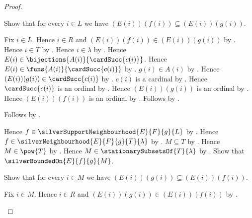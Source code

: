 \begin{proof}
\begin{byCase}
            \begin{subproof}
                Show that for every $i\in L$ we have
                    $(E(i))(f(i))\subseteq(E(i))(g(i))$.
                \begin{subproof}
                    Fix $i\in L$.
                    Hence $i\in R$ and
                        $(E(i))(f(i))\in(E(i))(g(i))$
                        by .
                    Hence $i\in T$ by .
                    Hence $i\in\lambda$ by .
                    Hence $E(i)\in\bijections{A(i)}{\cardSucc{c(i)}}$.
                    Hence $E(i)\in\funs{A(i)}{\cardSucc{c(i)}}$
                        by .
                    $g(i)\in A(i)$ by .
                    Hence $(E(i))(g(i))\in\cardSucc{c(i)}$
                        by .
                    $c(i)$ is a cardinal
                        by .
                    Hence $\cardSucc{c(i)}$ is an ordinal
                        by .
                    Hence $(E(i))(g(i))$ is an ordinal
                        by .
                    Hence $(E(i))(f(i))$ is an ordinal
                        by .
                    Follows by .
                \end{subproof}
                Follows by .
            \end{subproof}
            Hence $f\in\silverSupportNeighbourhood{E}{F}{g}{L}$
                by .
            Hence $f\in\silverNeighbourhood{E}{F}{g}{T}{\lambda}$
                by .
            $M\subseteq T$ by .
            Hence $M\in\pow{T}$ by .
            Hence $M\in\stationarySubsetsOf{T}{\lambda}$
                by .
            Show that $\silverBoundedOn{E}{f}{g}{M}$.
            \begin{subproof}
                Show that for every $i\in M$ we have
                    $(E(i))(g(i))\subseteq(E(i))(f(i))$.
                \begin{subproof}
                    Fix $i\in M$.
                    Hence $i\in R$ and
                        $(E(i))(g(i))\in(E(i))(f(i))$
                        by .

\end{subproof}
\end{subproof}
\end{byCase}
\end{proof}

